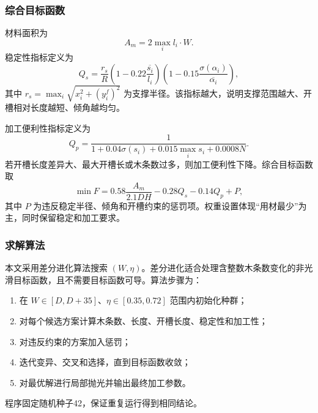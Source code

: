 \documentclass[UTF8,a4paper,12pt]{ctexart}
\begin{document}
\subsubsection{综合目标函数}
材料面积为
\begin{equation}
 A_m=2\max_i l_i\cdot W.
\end{equation}
稳定性指标定义为
\begin{equation}
 Q_s=\frac{r_s}{R}\left(1-0.22\overline{\frac{s_i}{l_i}}\right)
\left(1-0.15\frac{\sigma(\alpha_i)}{\overline{\alpha_i}}\right),
\end{equation}
其中 $r_s=\max_i\sqrt{x_i^2+(y_i^f)^2}$ 为支撑半径。该指标越大，说明支撑范围越大、开槽相对长度越短、倾角越均匀。

加工便利性指标定义为
\begin{equation}
 Q_p=\frac{1}{1+0.04\sigma(s_i)+0.015\max_i s_i+0.0008N}.
\end{equation}
若开槽长度差异大、最大开槽长或木条数过多，则加工便利性下降。综合目标函数取
\begin{equation}
 \min F=0.58\frac{A_m}{2.1DH}-0.28Q_s-0.14Q_p+P,
\end{equation}
其中 $P$ 为违反稳定半径、倾角和开槽约束的惩罚项。权重设置体现“用材最少”为主，同时保留稳定和加工要求。

\subsubsection{求解算法}
本文采用差分进化算法搜索 $(W,\eta)$。差分进化适合处理含整数木条数变化的非光滑目标函数，且不需要目标函数可导。算法步骤为：
\begin{enumerate}
\item 在 $W\in[D,D+35]$、$\eta\in[0.35,0.72]$ 范围内初始化种群；
\item 对每个候选方案计算木条数、长度、开槽长度、稳定性和加工性；
\item 对违反约束的方案加入惩罚；
\item 迭代变异、交叉和选择，直到目标函数收敛；
\item 对最优解进行局部抛光并输出最终加工参数。
\end{enumerate}
程序固定随机种子42，保证重复运行得到相同结论。
\end{document}
